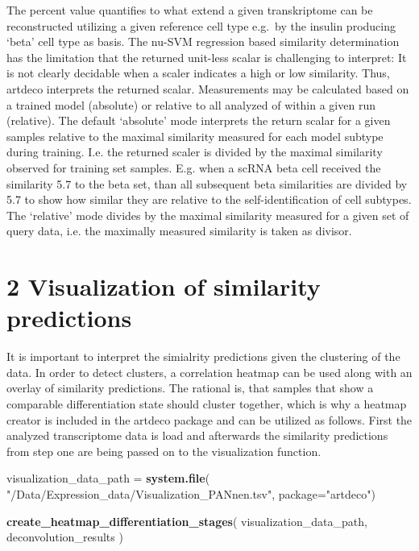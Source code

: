 \documentclass[]{article}
\newenvironment{Shaded}{\begin{snugshade}}{\end{snugshade}}
\newcommand{\KeywordTok}[1]{\textcolor[rgb]{0.13,0.29,0.53}{\textbf{#1}}}
\newcommand{\DataTypeTok}[1]{\textcolor[rgb]{0.13,0.29,0.53}{#1}}
\newcommand{\StringTok}[1]{\textcolor[rgb]{0.31,0.60,0.02}{#1}}
\newcommand{\NormalTok}[1]{#1}
\begin{document}
The percent value quantifies to what extend a given transkriptome can be
reconstructed utilizing a given reference cell type e.g.~by the insulin
producing `beta' cell type as basis. The nu-SVM regression based
similarity determination has the limitation that the returned unit-less
scalar is challenging to interpret: It is not clearly decidable when a
scaler indicates a high or low similarity. Thus, artdeco interprets the
returned scalar. Measurements may be calculated based on a trained model
(absolute) or relative to all analyzed of within a given run (relative).
The default `absolute' mode interprets the return scalar for a given
samples relative to the maximal similarity measured for each model
subtype during training. I.e. the returned scaler is divided by the
maximal similarity observed for training set samples. E.g. when a scRNA
beta cell received the similarity 5.7 to the beta set, than all
subsequent beta similarities are divided by 5.7 to show how similar they
are relative to the self-identification of cell subtypes. The `relative'
mode divides by the maximal similarity measured for a given set of query
data, i.e. the maximally measured similarity is taken as divisor.

\section{2 Visualization of similarity
predictions}\label{visualization-of-similarity-predictions}

It is important to interpret the simialrity predictions given the
clustering of the data. In order to detect clusters, a correlation
heatmap can be used along with an overlay of similarity predictions. The
rational is, that samples that show a comparable differentiation state
should cluster together, which is why a heatmap creator is included in
the artdeco package and can be utilized as follows. First the analyzed
transcriptome data is load and afterwards the similarity predictions
from step one are being passed on to the visualization function.

\begin{Shaded}
\begin{Highlighting}[]
\NormalTok{visualization_data_path =}\StringTok{ }\KeywordTok{system.file}\NormalTok{(}
    \StringTok{"/Data/Expression_data/Visualization_PANnen.tsv"}\NormalTok{,}
    \DataTypeTok{package=}\StringTok{"artdeco"}\NormalTok{)}

\KeywordTok{create_heatmap_differentiation_stages}\NormalTok{(}
\NormalTok{    visualization_data_path,}
\NormalTok{    deconvolution_results}
\NormalTok{)}
\end{Highlighting}
\end{Shaded}
\end{document}
